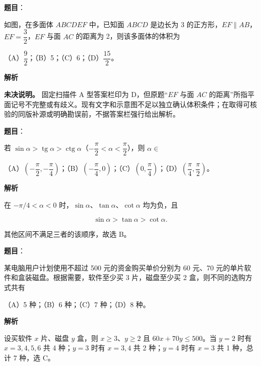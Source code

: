 \begin{answer}

\textbf{题目}：

如图，在多面体 $ABCDEF$ 中，已知面 $ABCD$ 是边长为 3 的正方形，$EF\parallel AB$，$EF=\dfrac32$，$EF$ 与面 $AC$ 的距离为 2，则该多面体的体积为

（A）$\dfrac92$；（B）5；（C）6；（D）$\dfrac{15}{2}$。
\nopagebreak[4]
\begin{center}\end{center}
\nopagebreak[4]
\textbf{解析}

\textbf{未决说明。} 固定扫描件 A 型答案栏印为 D，但原题“$EF$ 与面 $AC$ 的距离”所指平面记号不完整或有歧义。现有文字和示意图不足以独立确认体积条件；在取得可核验的同版补源或明确勘误前，不据答案栏强行给出解析。


\end{answer}
\begin{answer}

\textbf{题目}：

若 $\sin\alpha>\operatorname{tg}\alpha>\operatorname{ctg}\alpha$（$-\dfrac\pi2<\alpha<\dfrac\pi2$），则 $\alpha\in$

（A）$\left(-\dfrac\pi2,-\dfrac\pi4\right)$；（B）$\left(-\dfrac\pi4,0\right)$；（C）$\left(0,\dfrac\pi4\right)$；（D）$\left(\dfrac\pi4,\dfrac\pi2\right)$。

\textbf{解析}

在 $-\pi/4<\alpha<0$ 时，$\sin\alpha$、$\tan\alpha$、$\cot\alpha$ 均为负，且

\nopagebreak[4]
\[
\sin\alpha>\tan\alpha>\cot\alpha.
\]

其他区间不满足三者的该顺序，故选 B。


\end{answer}
\begin{answer}

\textbf{题目}：

某电脑用户计划使用不超过 500 元的资金购买单价分别为 60 元、70 元的单片软件和盒装磁盘。根据需要，软件至少买 3 片，磁盘至少买 2 盒，则不同的选购方式共有

（A）5 种；（B）6 种；（C）7 种；（D）8 种。

\textbf{解析}

设买软件 $x$ 片、磁盘 $y$ 盒，则 $x\ge3$、$y\ge2$ 且 $60x+70y\le500$。当 $y=2$ 时有 $x=3,4,5,6$ 共 4 种；$y=3$ 时有 $x=3,4$ 共 2 种；$y=4$ 时有 $x=3$ 共 1 种，总计 7 种，选 C。


\end{answer}
